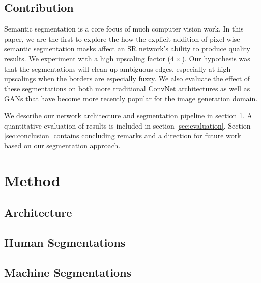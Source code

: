 \documentclass[10pt,twocolumn,letterpaper]{article}
\begin{document}
\subsection{Contribution}
Semantic segmentation is a core focus of much computer vision work. In this
paper, we are the first to explore the how the explicit addition of pixel-wise
semantic segmentation masks affect an SR network's ability to produce quality
results. We experiment with a high upscaling factor ($4 \times$). Our
hypothesis was that the segmentations will clean up ambiguous edges, especially
at high upscalings when the borders are especially fuzzy. We also evaluate the
effect of these segmentations on both more traditional ConvNet architectures as
well as GANs that have become more recently popular for the image generation
domain.

We describe our network architecture and segmentation pipeline in section \ref{sec:method}. A quantitative evaluation of results is included in section \ref{sec:evaluation}. Section \ref{sec:conclusion} contains concluding remarks and a direction for future work based on our segmentation approach. 


\section{Method}
\label{sec:method}

\subsection{Architecture}

\subsection{Human Segmentations}

\subsection{Machine Segmentations}
\end{document}
